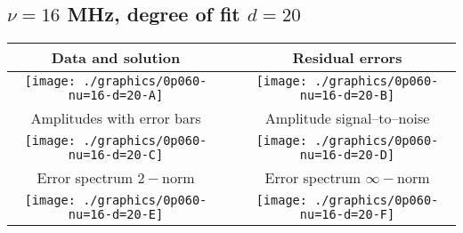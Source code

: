 

% 

\clearpage{}
\break{}

\subsection{$\nu = 16$ MHz, degree of fit $d = 20$}

\begin{table}[h]
    \begin{center}
        \begin{tabular}{ccc}
            Data and solution & \quad & Residual errors \\\hline
            \texttt{[image: ./graphics/0p060-nu=16-d=20-A]} &&
            \texttt{[image: ./graphics/0p060-nu=16-d=20-B]} \\[15pt]
            Amplitudes with error bars && Amplitude signal--to--noise \\\hline
            \texttt{[image: ./graphics/0p060-nu=16-d=20-C]} &&
            \texttt{[image: ./graphics/0p060-nu=16-d=20-D]} \\[15pt]
            Error spectrum $2-$norm && Error spectrum $\infty-$norm \\\hline
            \texttt{[image: ./graphics/0p060-nu=16-d=20-E]} &&
            \texttt{[image: ./graphics/0p060-nu=16-d=20-F]} \\[15pt]
        \end{tabular}
    \end{center}
\label{fig:elev=60, nu=16}
\end{table}



\endinput
